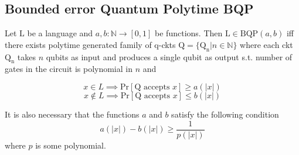 \documentclass[../main.tex]{subfiles}
\begin{document}
\subsection{Bounded error Quantum Polytime BQP}

Let $\mathrm{L}$ be a language and $a, b: \mathbb{N}\rightarrow [0,1]$ be functions. Then $\mathrm{L} \in \mathrm{BQP}(a,b)$ iff there exists polytime generated family of q-ckts $\mathrm{Q} = \{\mathrm{Q_n}|n\in \mathbb{N}\}$ where each ckt $\mathrm{Q_n}$ takes $n$ qubits as input and produces a single qubit as output s.t. number of gates in the circuit is polynomial in $n$ and

\begin{equation*}
    x \in L \implies \mathrm{Pr}[\mathrm{Q}\text{ accepts }x] \ge a(|x|)
\end{equation*}
\begin{equation*}
    x \not\in L \implies \mathrm{Pr}[\mathrm{Q}\text{ accepts }x] \le b(|x|)
\end{equation*}

\noindent It is also necessary that the functions $a$ and $b$ satisfy the following condition
\begin{equation*}
    a(|x|) - b(|x|) \ge \frac{1}{p(|x|)}
\end{equation*}
where $p$ is some polynomial.
\end{document}
